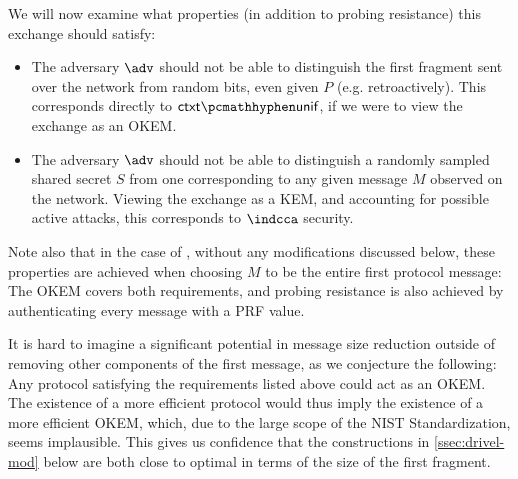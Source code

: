We will now examine what properties (in addition to probing resistance) this exchange should satisfy:
\begin{itemize}
    \item The adversary $\adv$ should not be able to distinguish the first fragment sent over the network from random bits, even given $P$ (e.g. retroactively). This corresponds directly to $\ctxtunif$, if we were to view the exchange as an OKEM.

    \item The adversary $\adv$ should not be able to distinguish a randomly sampled shared secret $S$ from one corresponding to any given message $M$ observed on the network. Viewing the exchange as a KEM, and accounting for possible active attacks, this corresponds to $\indcca$ security.
    
\end{itemize}

Note also that in the case of \drivel{}, without any modifications discussed below, these properties are achieved when choosing $M$ to be the entire first protocol message:
The OKEM covers both requirements, and probing resistance is also achieved by authenticating every message with a PRF value.

It is hard to imagine a significant potential in message size reduction outside of removing other components of the first \drivel{} message, as we conjecture the following:
Any protocol satisfying the requirements listed above could act as an OKEM.
The existence of a more efficient protocol would thus imply the existence of a more efficient OKEM, which, due to the large scope of the NIST Standardization, seems implausible.
This gives us confidence that the constructions in \cref{ssec:drivel-mod} below are both close to optimal in terms of the size of the first fragment.

